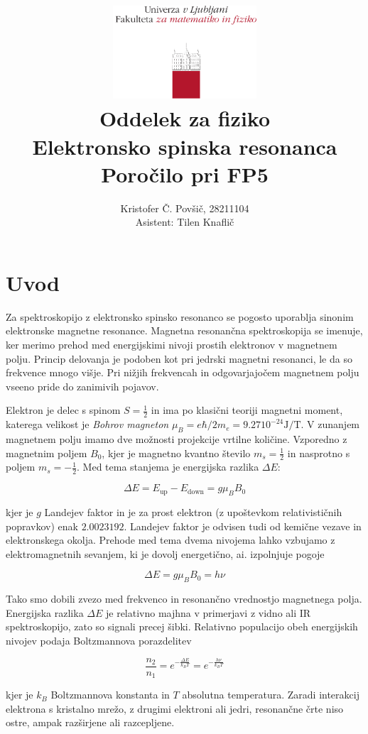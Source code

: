 \documentclass[11pt]{article}
\title{
  \includegraphics[width=0.4\textwidth]{fmf_logo}\\
  {\small Oddelek za fiziko} \\
  {Elektronsko spinska resonanca}\\
  {\small Poročilo pri FP5}\\
}
\date{}
\author{ Kristofer Č. Povšič, 28211104 \\[5 cm]
 \small  Asistent: Tilen Knaflič \\
}
\begin{document}
\maketitle
\tableofcontents

\section{Uvod}\label{sec:org2f7b62e}
Za spektroskopijo z elektronsko spinsko resonanco se pogosto uporablja sinonim elektronske magnetne resonance. Magnetna resonančna spektroskopija se imenuje, ker merimo prehod med energijskimi nivoji prostih elektronov v magnetnem polju. Princip delovanja je podoben kot pri jedrski magnetni resonanci, le da so frekvence mnogo višje. Pri nižjih frekvencah in odgovarjajočem magnetnem polju vseeno pride do zanimivih pojavov.

Elektron je delec s spinom \(S = \frac{1}{2}\) in ima po klasični teoriji magnetni moment, katerega velikost je \emph{Bohrov magneton} \(\mu_B = e \hbar/ 2 m_e = 9.27 10^{-24} \mathrm{J} / \mathrm{T}\). V zunanjem magnetnem polju imamo dve možnosti projekcije vrtilne količine. Vzporedno z magnetnim poljem \(B_0\), kjer je magnetno kvantno število \(m_s = \frac{1}{2}\) in nasprotno s poljem \(m_s = - \frac{1}{2}\). Med tema stanjema je energijska razlika \(\Delta E\):

\[ \Delta E = E_{\text{up}} - E_{\text{down}} = g \mu_B B_0
\]

kjer je \(g\) Landejev faktor in je za prost elektron (z upoštevkom relativističnih popravkov) enak \(2.0023192\). Landejev faktor je odvisen tudi od kemične vezave in elektronskega okolja. Prehode med tema dvema nivojema lahko vzbujamo z elektromagnetnih sevanjem, ki je dovolj energetično, ai. izpolnjuje pogoje

\[ \Delta E = g \mu_B B_0 = h \nu
\]

Tako smo dobili zvezo med frekvenco in resonančno vrednostjo magnetnega polja. Energijska razlika \(\Delta E\) je relativno majhna v primerjavi z vidno ali IR spektroskopijo, zato so signali precej šibki. Relativno populacijo obeh energijskih nivojev podaja Boltzmannova porazdelitev

\[ \frac{n_2}{n_1} = e ^{- \frac{\Delta E}{k_B T}} = e ^{- \frac{h \nu}{k_B T}}
\]

kjer je \(k_B\) Boltzmannova konstanta in \(T\) absolutna temperatura. Zaradi interakcij elektrona s kristalno mrežo, z drugimi elektroni ali jedri, resonančne črte niso ostre, ampak razširjene ali razcepljene.
\end{document}
